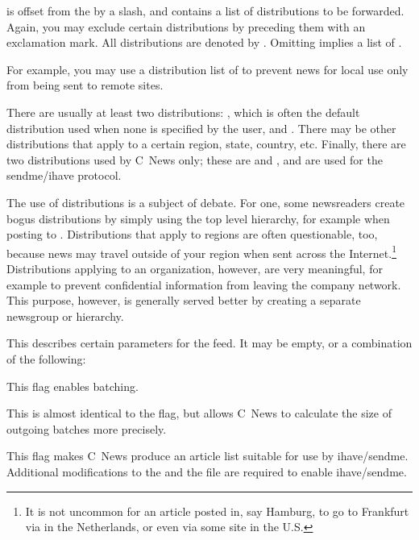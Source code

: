 \documentclass[11pt,makeidx]{report}
\begin{document}
{\begin{dispitems}
	is offset from the  by a slash, and contains a
	list of distributions to be forwarded.  Again, you may exclude
	certain distributions by preceding them with an exclamation
	mark. All distributions are denoted by . Omitting
	 implies a list of .


	For example, you may use a distribution list of
	 to prevent news for local use only from
	being sent to remote sites.


	There are usually at least two distributions: ,
	which is often the default distribution used when none is
	specified by the user, and . There may be other
	distributions that apply to a certain region, state, country,
	etc. Finally, there are two distributions used by C~News only;
	these are  and , and are used for
	the sendme/ihave protocol.


	The use of distributions is a subject of debate. For one, some
	newsreaders create bogus distributions by simply using the top
	level hierarchy, for example  when posting to
	.  Distributions that apply to regions are
	often questionable, too, because news may travel outside of your
	region when sent across the Internet.\footnote{
	  It is not uncommon for an article posted in, say Hamburg,
	  to go to Frankfurt via  in the 
	  Netherlands, or even via some site in the U.S.
	} Distributions applying to an organization, however, are very
	meaningful, for example to prevent confidential information from
	leaving the company network. This purpose, however, is generally
	served better by creating a separate newsgroup or hierarchy.



	This describes certain parameters for the feed. It may be
	empty, or a combination of the following:

	\begin{dispitems}
	\ditem[\keyword{F}]
		This flag enables batching.

	\ditem[\keyword{f}]
		This is almost identical to the  flag, but allows 
		C~News to calculate the size of outgoing batches more
		precisely.

	\ditem[\keyword{I}]
		This flag makes C~News produce an article list suitable
		for use by ihave/sendme. Additional modifications to the
		 and the  file are required
		to enable ihave/sendme.


\end{dispitems}
\end{dispitems}}
\end{document}
